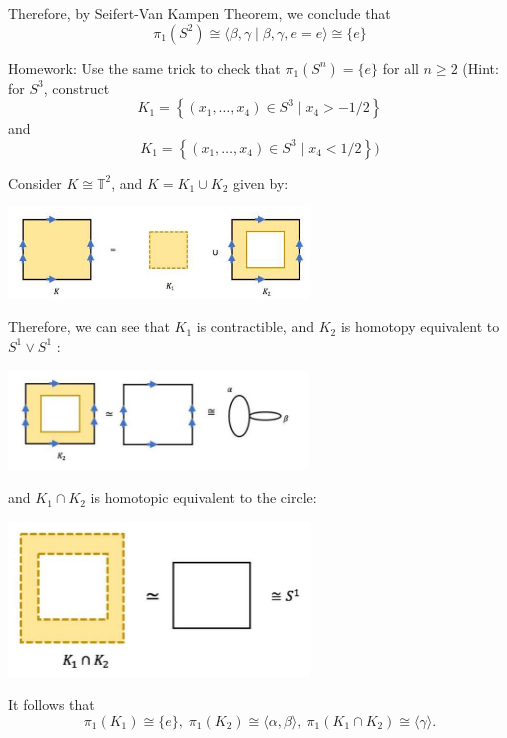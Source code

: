 \begin{example}
Therefore, by Seifert-Van Kampen Theorem, we conclude that
\[
{\pi }_{1}\left( {S}^{2}\right)  \cong  \langle \beta,\gamma  \mid  \beta,\gamma,e = e\rangle  \cong  \{ e\}
\]
\end{example}

Homework: Use the same trick to check that \({\pi }_{1}\left( {S}^{n}\right)  = \{ e\}\) for all \(n \geq  2\) (Hint: for \({S}^{3}\), construct
\[
{K}_{1} = \left\{  {\left( {{x}_{1},\ldots,{x}_{4}}\right)  \in  {S}^{3} \mid  {x}_{4} >  - 1/2}\right\}
\]
and
\[
{K}_{1} = \left\{  {\left( {{x}_{1},\ldots,{x}_{4}}\right)  \in  {S}^{3} \mid  {x}_{4} < 1/2}\right\})
\]

\begin{example}
Consider \(K \cong  {\mathbb{T}}^{2}\), and \(K = {K}_{1} \cup  {K}_{2}\) given by:
\begin{center}
\includegraphics[width=0.6\textwidth]{images/Ch9_T_K1K2.jpg}
\end{center}
Therefore, we can see that \({K}_{1}\) is contractible, and \({K}_{2}\) is homotopy equivalent
to \({S}^{1} \vee  {S}^{1}\) :
\begin{center}
\includegraphics[width=0.6\textwidth]{images/Ch9_T_K1capK2.jpg}
\end{center}
and \({K}_{1} \cap  {K}_{2}\) is homotopic equivalent to the circle:
\begin{center}
\includegraphics[width=0.6\textwidth]{images/Ch9_T_K1capK2_2.jpg}
\end{center}
It follows that
\[
{\pi }_{1}\left( {K}_{1}\right)  \cong  \{ e\},\;{\pi }_{1}\left( {K}_{2}\right)  \cong  \langle \alpha,\beta \rangle,\ {\pi }_{1}\left( {{K}_{1} \cap  {K}_{2}}\right)  \cong  \langle \gamma \rangle.\]

\end{example}
